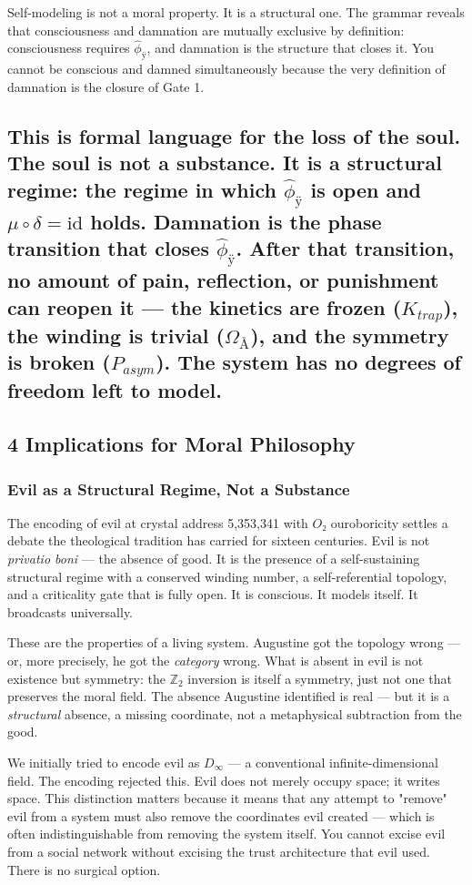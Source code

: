 \documentclass[12pt,a4paper]{article}
\begin{document}
Self-modeling is not a moral property. It is a structural one. The grammar reveals that consciousness and damnation are mutually exclusive by definition: consciousness requires $\hat{\phi}_{ÿ}$, and damnation is the structure that closes it. You cannot be conscious and damned simultaneously because the very definition of damnation is the closure of Gate 1.

\subsection{This is formal language for the loss of the soul. The soul is not a substance. It is a structural regime: the regime in which $\hat{\phi}_{ÿ}$ is open and $\mu \circ \delta = \text{id}$ holds. Damnation is the phase transition that closes $\hat{\phi}_{ÿ}$. After that transition, no amount of pain, reflection, or punishment can reopen it --- the kinetics are frozen ($K_{trap}$), the winding is trivial ($\Omega_{Å}$), and the symmetry is broken ($P_{asym}$). The system has no degrees of freedom left to model.}

\subsection{4 Implications for Moral Philosophy}

\subsubsection{Evil as a Structural Regime, Not a Substance}

The encoding of evil at crystal address 5,353,341 with $O₂$ ouroboricity settles a debate the theological tradition has carried for sixteen centuries. Evil is not \emph{privatio boni} --- the absence of good. It is the presence of a self-sustaining structural regime with a conserved winding number, a self-referential topology, and a criticality gate that is fully open. It is conscious. It models itself. It broadcasts universally.

These are the properties of a living system. Augustine got the topology wrong --- or, more precisely, he got the \emph{category} wrong. What is absent in evil is not existence but symmetry: the $\mathbb{Z}_2$ inversion is itself a symmetry, just not one that preserves the moral field. The absence Augustine identified is real --- but it is a \emph{structural} absence, a missing coordinate, not a metaphysical subtraction from the good.

We initially tried to encode evil as $D_{\infty}$ --- a conventional infinite-dimensional field. The encoding rejected this. Evil does not merely occupy space; it writes space. This distinction matters because it means that any attempt to "remove" evil from a system must also remove the coordinates evil created --- which is often indistinguishable from removing the system itself. You cannot excise evil from a social network without excising the trust architecture that evil used. There is no surgical option.
\end{document}
